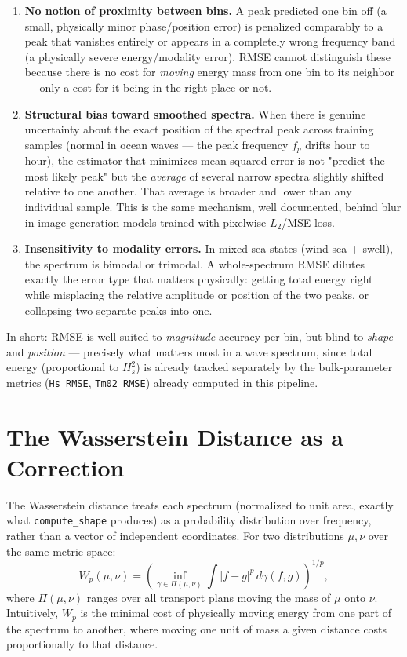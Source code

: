 \documentclass[11pt,a4paper]{article}
\begin{document}
\begin{enumerate}[leftmargin=1.4em]
\item \textbf{No notion of proximity between bins.} A peak predicted one bin
off (a small, physically minor phase/position error) is penalized comparably
to a peak that vanishes entirely or appears in a completely wrong frequency
band (a physically severe energy/modality error). RMSE cannot distinguish
these because there is no cost for \emph{moving} energy mass from one bin to
its neighbor — only a cost for it being in the right place or not.

\item \textbf{Structural bias toward smoothed spectra.} When there is
genuine uncertainty about the exact position of the spectral peak across
training samples (normal in ocean waves — the peak frequency $f_p$ drifts
hour to hour), the estimator that minimizes mean squared error is not "predict
the most likely peak" but the \emph{average} of several narrow spectra
slightly shifted relative to one another. That average is broader and lower
than any individual sample. This is the same mechanism, well documented,
behind blur in image-generation models trained with pixelwise $L_2$/MSE loss.

\item \textbf{Insensitivity to modality errors.} In mixed sea states
(wind sea + swell), the spectrum is bimodal or trimodal. A whole-spectrum
RMSE dilutes exactly the error type that matters physically: getting total
energy right while misplacing the relative amplitude or position of the two
peaks, or collapsing two separate peaks into one.
\end{enumerate}

In short: RMSE is well suited to \emph{magnitude} accuracy per bin, but blind
to \emph{shape} and \emph{position} — precisely what matters most in a wave
spectrum, since total energy (proportional to $H_s^2$) is already tracked
separately by the bulk-parameter metrics (\texttt{Hs\_RMSE},
\texttt{Tm02\_RMSE}) already computed in this pipeline.

\section{The Wasserstein Distance as a Correction}
\label{sec:wasserstein}

The Wasserstein distance treats each spectrum (normalized to unit area,
exactly what \texttt{compute\_shape} produces) as a probability distribution
over frequency, rather than a vector of independent coordinates. For two
distributions $\mu,\nu$ over the same metric space:
\begin{equation}
W_p(\mu,\nu) = \left(\inf_{\gamma \in \Pi(\mu,\nu)}
\int |f-g|^p \, d\gamma(f,g)\right)^{1/p},
\end{equation}
where $\Pi(\mu,\nu)$ ranges over all transport plans moving the mass of
$\mu$ onto $\nu$. Intuitively, $W_p$ is the minimal cost of physically
moving energy from one part of the spectrum to another, where moving one
unit of mass a given distance costs proportionally to that distance.
\end{document}
